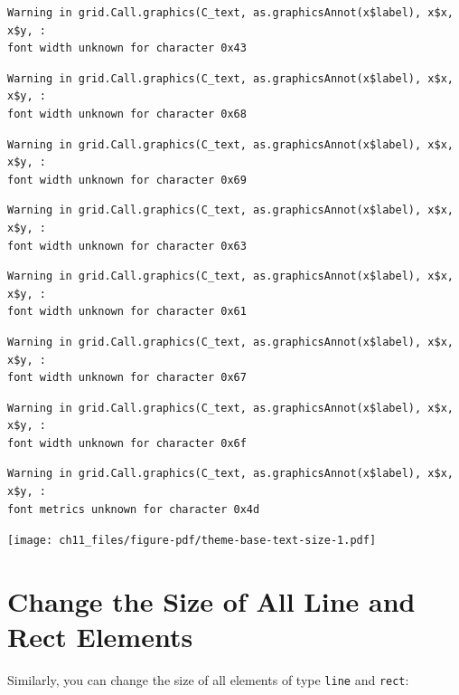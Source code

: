 \documentclass[
  letterpaper,
  DIV=11,
  numbers=noendperiod]{scrreprt}
\begin{document}
\begin{verbatim}
Warning in grid.Call.graphics(C_text, as.graphicsAnnot(x$label), x$x, x$y, :
font width unknown for character 0x43
\end{verbatim}

\begin{verbatim}
Warning in grid.Call.graphics(C_text, as.graphicsAnnot(x$label), x$x, x$y, :
font width unknown for character 0x68
\end{verbatim}

\begin{verbatim}
Warning in grid.Call.graphics(C_text, as.graphicsAnnot(x$label), x$x, x$y, :
font width unknown for character 0x69
\end{verbatim}

\begin{verbatim}
Warning in grid.Call.graphics(C_text, as.graphicsAnnot(x$label), x$x, x$y, :
font width unknown for character 0x63
\end{verbatim}

\begin{verbatim}
Warning in grid.Call.graphics(C_text, as.graphicsAnnot(x$label), x$x, x$y, :
font width unknown for character 0x61
\end{verbatim}

\begin{verbatim}
Warning in grid.Call.graphics(C_text, as.graphicsAnnot(x$label), x$x, x$y, :
font width unknown for character 0x67
\end{verbatim}

\begin{verbatim}
Warning in grid.Call.graphics(C_text, as.graphicsAnnot(x$label), x$x, x$y, :
font width unknown for character 0x6f
\end{verbatim}

\begin{verbatim}
Warning in grid.Call.graphics(C_text, as.graphicsAnnot(x$label), x$x, x$y, :
font metrics unknown for character 0x4d
\end{verbatim}

\texttt{[image: ch11\_files/figure-pdf/theme-base-text-size-1.pdf]}

\section{Change the Size of All Line and Rect
Elements}\label{change-the-size-of-all-line-and-rect-elements}

Similarly, you can change the size of all elements of type \texttt{line}
and \texttt{rect}:
\end{document}
